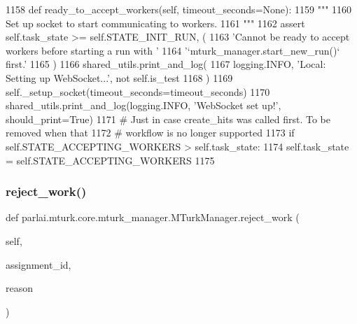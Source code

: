 \begin{DoxyCode}
1158     \textcolor{keyword}{def }ready\_to\_accept\_workers(self, timeout\_seconds=None):
1159         \textcolor{stringliteral}{"""}
1160 \textcolor{stringliteral}{        Set up socket to start communicating to workers.}
1161 \textcolor{stringliteral}{        """}
1162         \textcolor{keyword}{assert} self.task\_state >= self.STATE\_INIT\_RUN, (
1163             \textcolor{stringliteral}{'Cannot be ready to accept workers before starting a run with '}
1164             \textcolor{stringliteral}{'`mturk\_manager.start\_new\_run()` first.'}
1165         )
1166         shared\_utils.print\_and\_log(
1167             logging.INFO, \textcolor{stringliteral}{'Local: Setting up WebSocket...'}, \textcolor{keywordflow}{not} self.is\_test
1168         )
1169         self.\_setup\_socket(timeout\_seconds=timeout\_seconds)
1170         shared\_utils.print\_and\_log(logging.INFO, \textcolor{stringliteral}{'WebSocket set up!'}, should\_print=\textcolor{keyword}{True})
1171         \textcolor{comment}{# Just in case create\_hits was called first. To be removed when that}
1172         \textcolor{comment}{# workflow is no longer supported}
1173         \textcolor{keywordflow}{if} self.STATE\_ACCEPTING\_WORKERS > self.task\_state:
1174             self.task\_state = self.STATE\_ACCEPTING\_WORKERS
1175 
\end{DoxyCode}
\mbox{\label{classparlai_1_1mturk_1_1core_1_1mturk__manager_1_1MTurkManager_a06b4f16cfaf41feb192c79fcfa7407a3}} 
\subsubsection{\texorpdfstring{reject\+\_\+work()}{reject\_work()}}
{\footnotesize\ttfamily def parlai.\+mturk.\+core.\+mturk\+\_\+manager.\+M\+Turk\+Manager.\+reject\+\_\+work (\begin{DoxyParamCaption}\item[{}]{self,  }\item[{}]{assignment\+\_\+id,  }\item[{}]{reason }\end{DoxyParamCaption})}

